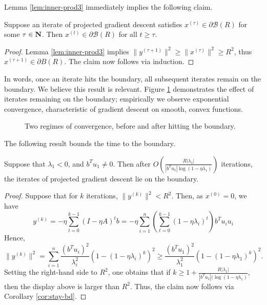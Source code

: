 \documentclass[11pt]{article}
\begin{document}
Lemma \ref{lem:inner-prod3} immediately implies the following claim. 
\begin{cor}\label{cor:stay-bd}
  Suppose an iterate of projected gradient descent satisfies $x^{(\tau)} \in \partial \mathcal{B}(R)$
  for some $\tau \in \mathbf{N}$. Then $x^{(t)} \in \partial \mathcal{B}(R)$ for all $t \geq \tau$.
\end{cor}
\begin{proof}
  Lemma \ref{lem:inner-prod3} implies $\|y^{(\tau + 1)}\|^2 \geq \|x^{(\tau)}\|^2 \geq R^2$, thus
  $x^{(\tau + 1)} \in \partial B(R)$. The claim now follows via induction. 
\end{proof}
In words, once an iterate hits the boundary, all subsequent iterates remain on the boundary.
We believe this result is relevant. Figure \ref{fig:convergence-rates-bd} demonstrates the effect of iterates remaining on the boundary;
empirically we observe exponential convergence, characteristic of gradient descent on smooth, convex functions. 
\begin{figure}[h!t]
    \centering
    \caption{Two regimes of convergence, before and after hitting the boundary.}
    \label{fig:convergence-rates-bd}
\end{figure}

The following result bounds the time to the boundary. 
\begin{claim}\label{claim:time-to-bd}
  Suppose that $\lambda_1 < 0$, and $b^Tu_1 \neq 0$. Then after $O\left(\frac{R|\lambda_1|}{|b^Tu_1|\log(1 - \eta \lambda_1)}\right)$ iterations,
  the iterates of projected gradient descent lie on the boundary. 
\end{claim}
\begin{proof}
  Suppose that for $k$ iterations, $\|y^{(k)}\|^2 < R^2$. Then, as $x^{(0)} = 0$, we have
  \[
  y^{(k)} = -\eta \sum_{t=0}^{k-1} (I-\eta A)^t b = -\eta\sum_{i=1}^n \left(\sum_{t=0}^{k-1} (1 - \eta \lambda_i)^t\right) b^Tu_i u_i 
  \]
  Hence,
  \[
  \|y^{(k)}\|^2 = \sum_{i=1}^n \frac{(b^Tu_i)^2}{\lambda_i^2} (1 - (1 - \eta \lambda_i)^k)^2 \geq \frac{(b^Tu_1)^2}{\lambda_1^2}(1 - (1-\eta \lambda_1)^k)^2. 
  \]
  Setting the right-hand side to $R^2$, one obtains that if $k \geq 1 + \frac{R|\lambda_1|}{|b^Tu_1|(\log(1 - \eta \lambda_1)}$, then
  the display above is larger than $R^2$. Thus, the claim now follows via Corollary \ref{cor:stay-bd}.
\end{proof}
\end{document}
